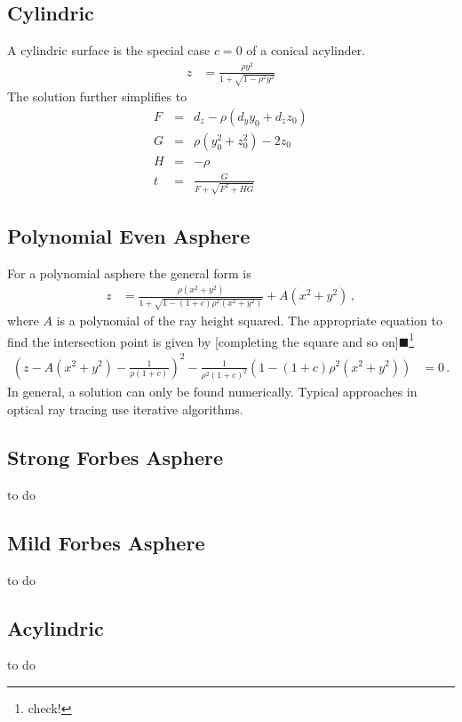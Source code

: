 \documentclass[12pt,a4paper,twoside,openright,BCOR10mm,headsepline,titlepage,abstracton,chapterprefix,final]{scrreprt}
\newcommand{\remark}[1]{{\color{red}$\blacksquare$}\footnote{{\color{red}#1}}}
\begin{document}
\subsection{Cylindric}
A cylindric surface is the special case $c = 0$ of a conical acylinder.
\begin{align}
 z &= \frac{ \rho y^2}{1 + \sqrt{1 - \rho^2 y^2}}
\end{align}
The solution further simplifies to
\begin{eqnarray}
   F &=& d_z - \rho \left(  d_y y_0 + d_z z_0  \right) \\
   G &=& \rho ( y_0^2 + z_0^2 ) - 2 z_0 \\
   H &=& - \rho \\
   t &=& \frac{G}{ F + \sqrt{F^2 + H G} }
\end{eqnarray}



\subsection{Polynomial Even Asphere}

For a polynomial asphere the general form is
\begin{align}
  z &=  \frac
 { \rho ( x^2 + y^2 ) }
 { 1 + \sqrt{1 - (1+c) \rho^2  (x^2 + y^2)} } + A(x^2 + y^2)\,,
\end{align}
where $A$ is a polynomial of the ray height squared.
The appropriate equation to find the intersection point is given by [completing the square and so on]\remark{check!}
\begin{align}
 \left(z - A(x^2 + y^2) - \frac{1}{\rho(1+c)}\right)^2 - \frac{1}{\rho^2 (1+c)^2} \left(1 -(1+c)\rho^2 (x^2 + y^2) \right) &= 0\,.
\end{align}
In general, a solution can only be found numerically. 
Typical approaches in optical ray tracing use iterative algorithms.

\subsection{Strong Forbes Asphere}
to do
\subsection{Mild Forbes Asphere}
to do
\subsection{Acylindric}
to do
\end{document}
